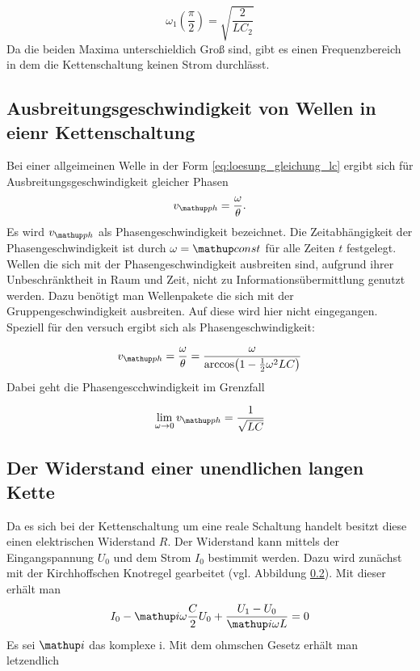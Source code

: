 \begin{equation}
\label{eq:max_omega_1_ceins_czwei}
\omega_1(\frac{\pi}{2})=\sqrt{\frac{2}{LC_2}}
\end{equation}
Da die beiden Maxima unterschieldich Groß sind, gibt es einen Frequenzbereich
in dem die Kettenschaltung keinen Strom durchlässt.
\subsection{Ausbreitungsgeschwindigkeit von Wellen in eienr Kettenschaltung}
Bei einer allgeimeinen Welle in der Form \eqref{eq:loesung_gleichung_lc}
ergibt sich für Ausbreitungsgeschwindigkeit gleicher Phasen
\begin{equation*}
v\ua{ph}=\frac{\omega}{\theta}.
\end{equation*}
Es wird $v\ua{ph}$ als Phasengeschwindigkeit bezeichnet.
Die Zeitabhängigkeit der Phasengeschwindigkeit ist durch $\omega=\map{const}$ 
für alle Zeiten $t$ festgelegt. Wellen die sich mit der Phasengeschwindigkeit
ausbreiten sind, aufgrund ihrer Unbeschränktheit in Raum und Zeit, nicht zu
Informationsübermittlung genutzt werden. Dazu benötigt man Wellenpakete die sich 
mit der Gruppengeschwindigkeit ausbreiten. Auf diese wird hier nicht eingegangen.
Speziell für den versuch ergibt sich als Phasengeschwindigkeit:

\begin{equation}
\label{eq:phasen_esc}
v\ua{ph}=\frac{\omega}{\theta}=\frac{\omega}{\arccos\!\left(1-\frac{1}{2}\omega^2LC\right)}
\end{equation}
Dabei geht die Phasengescchwindigkeit im Grenzfall

\begin{equation*}
\lim_{\omega\to 0}v\ua{ph}=\frac{1}{\sqrt{LC}}
\end{equation*}

\subsection{Der Widerstand einer unendlichen langen Kette}
Da es sich bei der Kettenschaltung um eine reale Schaltung handelt
besitzt diese einen elektrischen Widerstand $R$.
Der Widerstand kann mittels der Eingangspannung $U_0$ und dem Strom $I_0$ bestimmit werden.
Dazu wird zunächst mit der Kirchhoffschen Knotregel gearbeitet (vgl. Abbildung \ref{}).
Mit dieser erhält man
\begin{equation*}
I_0 - \map{i}\omega\frac{C}{2}U_0+\frac{U_1-U_0}{\map{i}\omega L}=0
\end{equation*}
Es sei $\map{i}$ das komplexe i.
Mit dem ohmschen Gesetz erhält man letzendlich

